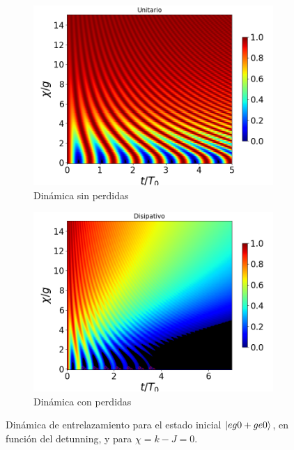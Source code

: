 \begin{figure}[h!]
    \centering
    \begin{subfigure}{0.49\textwidth}
        \includegraphics[width=\textwidth]{figuras/ch4/concu/chi/eg0+ge0 d=0.0g k=0.0g J=0.0g gamma=0.25g concu chi uni.png}
        \caption{Dinámica sin perdidas}
        \label{fig4:concu x 0 uni}
    \end{subfigure}
    \hfill
    \begin{subfigure}{0.49\textwidth}
        \includegraphics[width=\textwidth]{figuras/ch4/concu/chi/eg0+ge0 d=0.0g k=0.0g J=0.0g gamma=0.25g concu chi dis.png}
        \caption{Dinámica con perdidas}
        \label{fig4:concu x 0 dis}
    \end{subfigure}
    \caption{Dinámica de entrelazamiento para el estado inicial $\ket{eg0+ge0}$, en función del detunning, y para $\chi=k-J=0$.}
    \label{fig4:concu x 0}
\end{figure}

